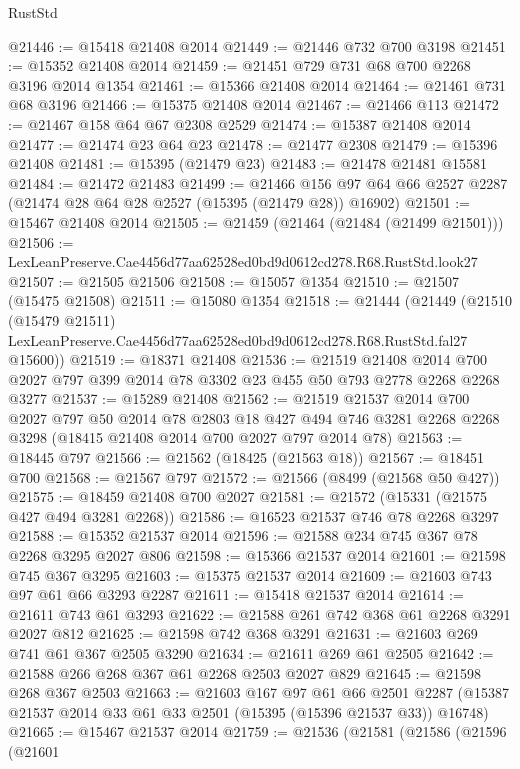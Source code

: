 \begin{lexlean}{RustStd}
\begin{coremodule}
@21446 := @15418 @21408 @2014
@21449 := @21446 @732 @700 @3198
@21451 := @15352 @21408 @2014
@21459 := @21451 @729 @731 @68 @700 @2268 @3196 @2014 @1354
@21461 := @15366 @21408 @2014
@21464 := @21461 @731 @68 @3196
@21466 := @15375 @21408 @2014
@21467 := @21466 @113
@21472 := @21467 @158 @64 @67 @2308 @2529
@21474 := @15387 @21408 @2014
@21477 := @21474 @23 @64 @23
@21478 := @21477 @2308
@21479 := @15396 @21408
@21481 := @15395 (@21479 @23)
@21483 := @21478 @21481 @15581
@21484 := @21472 @21483
@21499 := @21466
    @156
    @97
    @64
    @66
    @2527
    @2287
    (@21474 @28 @64 @28 @2527 (@15395 (@21479 @28)) @16902)
@21501 := @15467 @21408 @2014
@21505 := @21459 (@21464 (@21484 (@21499 @21501)))
@21506 := LexLeanPreserve.Cae4456d77aa62528ed0bd9d0612cd278.R68.RustStd.look27
@21507 := @21505 @21506
@21508 := @15057 @1354
@21510 := @21507 (@15475 @21508)
@21511 := @15080 @1354
@21518 := @21444
    (@21449
      (@21510
        (@15479 @21511)
        LexLeanPreserve.Cae4456d77aa62528ed0bd9d0612cd278.R68.RustStd.fal27
        @15600))
@21519 := @18371 @21408
@21536 := @21519
    @21408
    @2014
    @700
    @2027
    @797
    @399
    @2014
    @78
    @3302
    @23
    @455
    @50
    @793
    @2778
    @2268
    @2268
    @3277
@21537 := @15289 @21408
@21562 := @21519
    @21537
    @2014
    @700
    @2027
    @797
    @50
    @2014
    @78
    @2803
    @18
    @427
    @494
    @746
    @3281
    @2268
    @2268
    @3298
    (@18415 @21408 @2014 @700 @2027 @797 @2014 @78)
@21563 := @18445 @797
@21566 := @21562 (@18425 (@21563 @18))
@21567 := @18451 @700
@21568 := @21567 @797
@21572 := @21566 (@8499 (@21568 @50 @427))
@21575 := @18459 @21408 @700 @2027
@21581 := @21572 (@15331 (@21575 @427 @494 @3281 @2268))
@21586 := @16523 @21537 @746 @78 @2268 @3297
@21588 := @15352 @21537 @2014
@21596 := @21588 @234 @745 @367 @78 @2268 @3295 @2027 @806
@21598 := @15366 @21537 @2014
@21601 := @21598 @745 @367 @3295
@21603 := @15375 @21537 @2014
@21609 := @21603 @743 @97 @61 @66 @3293 @2287
@21611 := @15418 @21537 @2014
@21614 := @21611 @743 @61 @3293
@21622 := @21588 @261 @742 @368 @61 @2268 @3291 @2027 @812
@21625 := @21598 @742 @368 @3291
@21631 := @21603 @269 @741 @61 @367 @2505 @3290
@21634 := @21611 @269 @61 @2505
@21642 := @21588 @266 @268 @367 @61 @2268 @2503 @2027 @829
@21645 := @21598 @268 @367 @2503
@21663 := @21603
    @167
    @97
    @61
    @66
    @2501
    @2287
    (@15387 @21537 @2014 @33 @61 @33 @2501 (@15395 (@15396 @21537 @33)) @16748)
@21665 := @15467 @21537 @2014
@21759 := @21536
    (@21581
      (@21586
        (@21596
          (@21601

\end{coremodule}
\end{lexlean}
